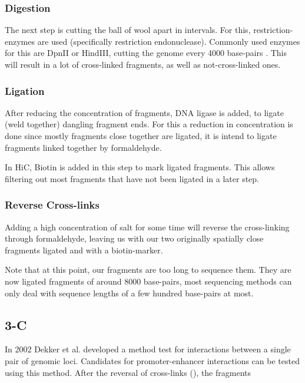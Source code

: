 \subsubsection{Digestion}\label{sec:digestion}

The next step is cutting the ball of wool apart in intervals. For this,
restriction-enzymes are used (specifically restriction endonuclease). Commonly
used enzymes for this are DpnII or HindIII, cutting the genome every 4000
base-pairs \cite{liebermann2009comprehensive}. This will result in a lot of
cross-linked fragments, as well as not-cross-linked ones.

\subsubsection{Ligation}\label{sec:ligation}

After reducing the concentration of fragments, DNA ligase is added, to ligate
(weld together) dangling fragment ends. For this a reduction in concentration
is done since mostly fragments close together are ligated, it is intend to
ligate fragments linked together by formaldehyde.

In HiC, Biotin is added in this step to mark ligated fragments. This allows
filtering out most fragments that have not been ligated in a later step.


\subsubsection{Reverse Cross-links}\label{sec:revcrosslink}

Adding a high concentration of salt for some time will reverse the
cross-linking through formaldehyde, leaving us with our two originally
spatially close fragments ligated and with a biotin-marker.


Note that at this point, our fragments are too long to sequence them.
They are now ligated fragments of around 8000 base-pairs, most sequencing
methods can only deal with sequence lengths of a few hundred base-pairs at
most.




\subsection{3-C}\label{sec:3C} 

In 2002 Dekker et al. \cite{dekker2002capturing} developed a method test for interactions
between a single pair of genomic loci. Candidates for promoter-enhancer
interactions can be tested using this method.
After the reversal of cross-links (), the fragments


